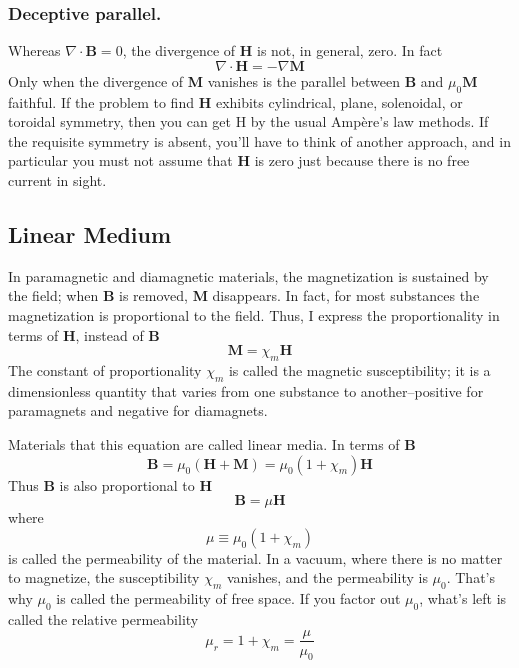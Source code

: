 \documentclass[../../../main.tex]{subfiles}
\begin{document}
\subsubsection*{Deceptive parallel.} Whereas $\nabla \cdot \mathbf{B} = 0$, the divergence of \textbf{H} is not, in general, zero. In fact 
\begin{equation*}
    \nabla \cdot\mathbf{H}=-\nabla\mathbf{M}
\end{equation*}
Only when the divergence of \textbf{M} vanishes is the parallel between \textbf{B} and $\mu_0\mathbf{M}$ faithful. If the problem to find \textbf{H} exhibits cylindrical, plane, solenoidal, or toroidal symmetry, then you can get H by the usual Ampère’s law methods. If the requisite symmetry is absent, you’ll have to think of another approach, and in particular you must not assume that \textbf{H} is zero just because there is no free current in sight. 

\subsection*{Linear Medium}
In paramagnetic and diamagnetic materials, the magnetization is sustained by the ﬁeld; when \textbf{B} is removed, \textbf{M} disappears. In fact, for most substances the magnetization is proportional to the ﬁeld. Thus, I express the proportionality in terms of \textbf{H}, instead of \textbf{B}
\begin{equation*}
    \mathbf{M}=\chi_m \mathbf{H}
\end{equation*}
The constant of proportionality $\chi_m$ is called the magnetic susceptibility; it is a dimensionless quantity that varies from one substance to another--positive for paramagnets and negative for diamagnets.

Materials that this equation are called linear media. In terms of \textbf{B}
\begin{equation*}
    \mathbf{B} = \mu_0(\mathbf{H} + \mathbf{M}) = \mu_0(1 + \chi_m )\mathbf{H}
\end{equation*}
Thus \textbf{B} is also proportional to \textbf{H}
\begin{equation*}
    \mathbf{B}=\mu\mathbf{H}
\end{equation*}
where
\begin{equation*}
    \mu\equiv\mu_0(1 + \chi_m )
\end{equation*}
is called the permeability of the material. In a vacuum, where there is no matter to magnetize, the susceptibility $\chi_m$ vanishes, and the permeability is $\mu_0$. That’s why $\mu_0$ is called the permeability of free space. If you factor out $\mu_0$, what’s left is called the relative permeability
\begin{equation*}
    \mu_r=1 + \chi_m=\frac{\mu}{\mu_0}
\end{equation*}
\end{document}
